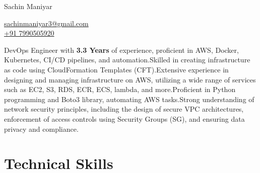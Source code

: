 \documentclass[letterpaper,10pt]{article}
\begin{document}
\begin{center}
    {\LARGE Sachin Maniyar} \\ 
    \begin{multicols}{2}
    \begin{flushleft}
    \href{https://www.linkedin.com/in/sachin-maniyar}{\faLinkedinSquare}
    
    \end{flushleft}
    
    \begin{flushright}
    
    \href{mailto:{your email adress}}{sachinmaniyar3@gmail.com}\\
    \href{{Phone Number: }}{+91 7990505920}\\

    \end{flushright}
    \end{multicols}
\end{center}


    \small{DevOps Engineer with \textbf{3.3 Years} of experience, proficient in AWS, Docker, Kubernetes, CI/CD pipelines, and
automation.Skilled in creating infrastructure as code using CloudFormation Templates (CFT).Extensive experience in designing and managing infrastructure on AWS, utilizing a wide range of services such as EC2, S3, RDS, ECR, ECS, lambda, and more.Proficient in Python programming and Boto3 library, automating AWS tasks.Strong understanding of network security principles, including the design of secure VPC
architectures, enforcement of access controls using Security Groups (SG), and ensuring data
privacy and compliance.}

\section{Technical Skills}
\end{document}
